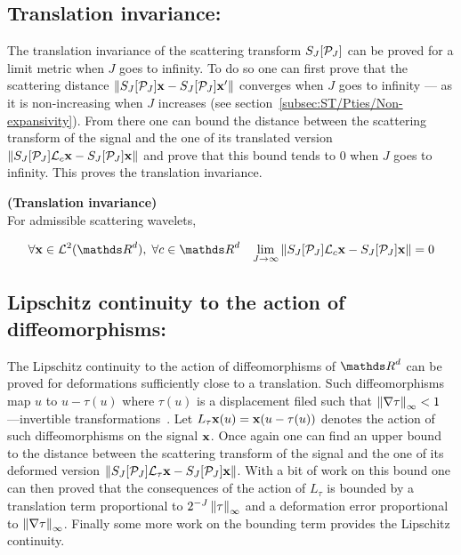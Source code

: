 \documentclass[a4paper,11pt]{report}
\begin{document}
		\subsection{Translation invariance:}
			\label{subsec:ST/Pties/Translation}		
			The translation invariance of the scattering transform $S_{J}[\mathcal{P}_{J}]$ can be proved for a limit metric when $J$ goes to infinity. To do so one can first prove that the scattering distance $\left\lVert S_{J}[\mathcal{P}_{J}]{\bf x} - S_{J}[\mathcal{P}_{J}]{\bf x}' \right\rVert$ converges when $J$ goes to infinity --- as it is non-increasing when $J$ increases (see section~\ref{subsec:ST/Pties/Non-expansivity}). From there one can bound the distance between the scattering transform of the signal and the one of its translated version $\left\lVert S_{J}[\mathcal{P}_{J}]\mathcal{L}_{c}{\bf x} - S_{J}[\mathcal{P}_{J}]{\bf x} \right\rVert$ and prove that this bound tends to $0$ when $J$ goes to infinity. This proves the translation invariance.
			
			\begin{thm} \textbf{(Translation invariance)}\\
				For admissible scattering wavelets,
				
				\begin{equation}
					\forall \bfx \in \mcalL^{2}(\dsR^{d}), \; \forall c \in \dsR^{d} \;\;\; \lim_{J \rightarrow \infty} \norm{S_{J}[\mcalP_{J}]\mcalL_{c}\bfx - S_{J}[\mcalP_{J}]\bfx} = 0
					\label{eq:Tranlation invariance}
				\end{equation}
				\label{thm:Translation invariance}
			  
			\end{thm}

		\subsection{Lipschitz continuity to the action of diffeomorphisms:}
			\label{subsec:ST/Pties/Lipschitz continuity}			
			The Lipschitz continuity to the action of diffeomorphisms of $\dsR^{d}$ can be proved for deformations sufficiently close to a translation. Such diffeomorphisms map $u$ to $u-\tau(u)$ where $\tau(u)$ is a displacement filed such that $\left\lVert \nabla \tau \right\rVert_{\infty} < 1$ ---\ie invertible transformations~\citep{bruna2013invariant}. Let $L_{\tau}{\bf x}(u)={\bf x}(u-\tau(u))$ denotes the action of such diffeomorphisms on the signal ${\bf x}$. Once again one can find an upper bound to the distance between the scattering transform of the signal and the one of its deformed version $\left\lVert S_{J}[\mathcal{P}_{J}]\mathcal{L}_{\tau}{\bf x} - S_{J}[\mathcal{P}_{J}]{\bf x} \right\rVert$. With a bit of work on this bound one can then proved that the consequences of the action of $L_{\tau}$ is bounded by a translation term proportional to $2^{-J} \left\lVert \tau \right\rVert_{\infty}$ and a deformation error proportional to $\left\lVert \nabla \tau \right\rVert_{\infty}$. Finally some more work on the bounding term provides the Lipschitz continuity.
			
\end{document}
